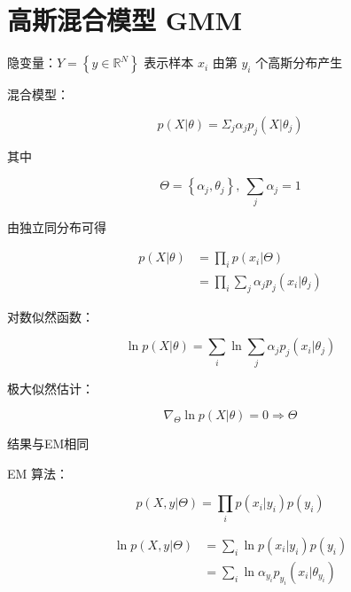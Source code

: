 \documentclass[openany,a4paper,12pt]{ctexbook}
\theoremstyle{kaiti}
\theoremstyle{normal}
\begin{document}
\section{高斯混合模型 GMM}

隐变量：$Y=\left\{ y\in \mathbb{R} ^N \right\}$ 表示样本 $x_i$ 由第 $y_i$ 个高斯分布产生

混合模型：

\begin{equation}
p(X|\theta)=\Sigma_j\alpha_jp_j\left(X|\theta_j \right)
\end{equation}

其中

\begin{equation}
\Theta =\left\{ \alpha_j,\theta_j \right\},~\sum_j\alpha_j=1
\end{equation}

由独立同分布可得

\begin{equation}
\begin{aligned}
  p(X|\theta)
  &=\prod_ip\left(x_i|\Theta \right)\\
  &=\prod_i\sum_j\alpha_jp_j\left(x_i|\theta_j \right)
\end{aligned}
\end{equation}

对数似然函数：

\begin{equation}
\ln p(X|\theta)=\sum_i\ln \sum_j\alpha_jp_j\left(x_i|\theta_j \right)
\end{equation}

极大似然估计：

\begin{equation}
\nabla_{\Theta}\ln p(X|\theta)=0\Rightarrow \Theta
\end{equation}

结果与EM相同

EM 算法：

\begin{equation}
p\left(X,y|\Theta \right)=\prod_ip\left(x_i|y_i \right)p\left(y_i \right)
\end{equation}

\begin{equation}
\begin{aligned}
  \ln p\left(X,y|\Theta \right)
  &=\sum_i\ln p\left(x_i|y_i \right)p\left(y_i \right)\\
  &=\sum_i\ln \alpha_{y_i}p_{y_i}\left(x_i|\theta_{y_i} \right)
\end{aligned}
\end{equation}
\end{document}

